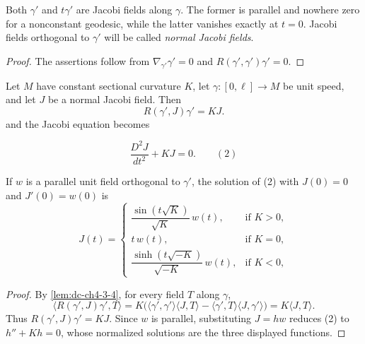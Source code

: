 \begin{remark}
  \label{rem:dc-ch5-2-2}


  Both $\gamma'$ and $t\gamma'$ are Jacobi fields along $\gamma$. The former is
  parallel and nowhere zero for a nonconstant geodesic, while the latter
  vanishes exactly at $t=0$. Jacobi fields orthogonal to $\gamma'$ will be called
  \emph{normal Jacobi fields}.
\end{remark}
\begin{proof}

  \sketch
  The assertions follow from $\nabla_{\gamma'}\gamma'=0$ and
  $R(\gamma',\gamma')\gamma'=0$.
\end{proof}

\begin{example}
  \label{ex:dc-ch5-2-3}


  Let $M$ have constant sectional curvature $K$, let
  $\gamma:[0,\ell]\to M$ be unit speed, and let $J$ be a normal Jacobi field.
  Then
  $$
  R(\gamma',J)\gamma'=KJ.
  $$
  and the Jacobi equation becomes

  $$
  \frac{D^2 J}{dt^2}+KJ=0.\qquad(2)
  $$

  If $w$ is a parallel unit field orthogonal to $\gamma'$, the solution of (2)
  with $J(0)=0$ and $J'(0)=w(0)$ is
  $$
  J(t)=\begin{cases}\dfrac{\sin(t\sqrt{K})}{\sqrt{K}}\,w(t),&\text{if }K>0,\\[1ex] t\,w(t),&\text{if }K=0,\\[1ex]\dfrac{\sinh(t\sqrt{-K})}{\sqrt{-K}}\,w(t),&\text{if }K<0,\end{cases}
  $$
\end{example}
\begin{proof}


  \sketch
  By \cref{lem:dc-ch4-3-4}, for every field $T$ along $\gamma$,
  $$
  \langle R(\gamma',J)\gamma',T\rangle
  =K\big(\langle\gamma',\gamma'\rangle\langle J,T\rangle
  -\langle\gamma',T\rangle\langle J,\gamma'\rangle\big)
  =K\langle J,T\rangle.
  $$
  Thus $R(\gamma',J)\gamma'=KJ$. Since $w$ is parallel, substituting
  $J=h w$ reduces (2) to $h''+Kh=0$, whose normalized solutions are the three
  displayed functions.
\end{proof}

